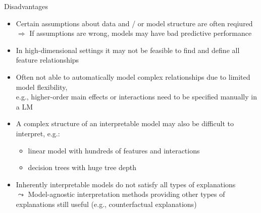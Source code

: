 \documentclass[11pt,compress,t,notes=noshow, aspectratio=169, xcolor=table]{beamer}
\begin{document}
\begin{frame}{Disadvantages}

    \begin{itemize}
    \itemsep1em
        \item Certain assumptions about data and / or model structure are often reqiured\\
        $\Rightarrow$ If assumptions are wrong, models may have bad predictive performance
        \item In high-dimensional settings it may not be feasible to find and define all feature relationships
        \pause
        \item Often not able to automatically model complex relationships due to limited model flexibility, \\
        e.g., higher-order main effects or interactions need to be specified manually in a LM
        \pause
        \item A complex structure of an interpretable model may also be difficult to interpret, e.g.:
        \begin{itemize}
            \item linear model with hundreds of features and interactions 
            \item decision trees with huge tree depth
        \end{itemize}
        \pause
        \item Inherently interpretable models do not satisfy all types of explanations\\
        $\leadsto$ Model-agnostic interpretation methods providing other types of explanations still useful (e.g., counterfactual explanations)
    \end{itemize}

\end{frame}
\end{document}
